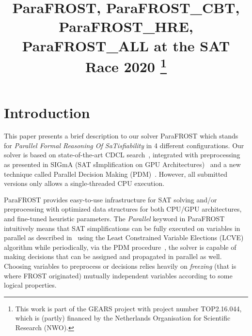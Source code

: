\documentclass[conference]{IEEEtran}
\newcommand{\parafrost}{ParaFROST\xspace}
\begin{document}
\title{ParaFROST, ParaFROST\_CBT, ParaFROST\_HRE, ParaFROST\_ALL at the SAT Race 2020
\thanks{This work is part of the GEARS project with project number TOP2.16.044, which is (partly) financed by the Netherlands Organisation for Scientific Research (NWO).}
}

\author{
}

\maketitle

\section{Introduction}
This paper presents a brief description to our solver \parafrost which stands for \emph{Parallel Formal Reasoning Of SaTisfiability} in 4 different configurations. Our solver is based on state-of-the-art CDCL search~\cite{grasp,minisat,glucose}, integrated with preprocessing as presented in SIGmA (SAT sImplification on GPU Architectures)~\cite{sigmaTacas,sigmaIfm} and a new technique called Parallel Decision Making (PDM)~\cite{pdcl}. However, all submitted versions only allows a single-threaded CPU execution.

\parafrost provides easy-to-use infrastructure for SAT solving and/or preprocessing with optimized data structures for both CPU/GPU architectures, and fine-tuned heuristic parameters. The \emph{Parallel} keyword in \parafrost intuitively means that SAT simplifications can be fully executed on variables in parallel as described in~\cite{sigmaTacas} using the Least Constrained Variable Elections (LCVE) algorithm while periodically, via the PDM procedure~\cite{pdcl}, the solver is capable of making decisions that can be assigned and propagated in parallel as well. Choosing variables to preprocess or decisions relies heavily on \emph{freezing} (that is where FROST originated) mutually independent variables according to some logical properties. 
%
%
\end{document}
